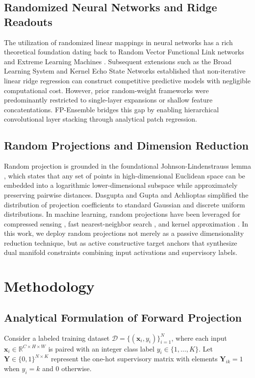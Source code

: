 \documentclass[journal]{IEEEtran}
\begin{document}
\subsection{Randomized Neural Networks and Ridge Readouts}
The utilization of randomized linear mappings in neural networks has a rich theoretical foundation dating back to Random Vector Functional Link networks \cite{pao1994functional, igelnik1995stochastic} and Extreme Learning Machines \cite{huang2006extreme, huang2011extreme}. Subsequent extensions such as the Broad Learning System \cite{chen2017broad, liu2021broad} and Kernel Echo State Networks \cite{jaeger2001echo, lukovsevivcius2012reservoir} established that non-iterative linear ridge regression can construct competitive predictive models with negligible computational cost. However, prior random-weight frameworks were predominantly restricted to single-layer expansions or shallow feature concatentations. FP-Ensemble bridges this gap by enabling hierarchical convolutional layer stacking through analytical patch regression.

\subsection{Random Projections and Dimension Reduction}
Random projection is grounded in the foundational Johnson-Lindenstrauss lemma \cite{johnson1984extensions}, which states that any set of points in high-dimensional Euclidean space can be embedded into a logarithmic lower-dimensional subspace while approximately preserving pairwise distances. Dasgupta and Gupta \cite{dasgupta2003elementary} and Achlioptas \cite{achlioptas2003database} simplified the distribution of projection coefficients to standard Gaussian and discrete uniform distributions. In machine learning, random projections have been leveraged for compressed sensing \cite{donoho2006compressed, candes2006robust}, fast nearest-neighbor search \cite{indyk1998approximate}, and kernel approximation \cite{rahimi2007random}. In this work, we deploy random projections not merely as a passive dimensionality reduction technique, but as active constructive target anchors that synthesize dual manifold constraints combining input activations and supervisory labels.

\section{Methodology}

\subsection{Analytical Formulation of Forward Projection}
Consider a labeled training dataset $\mathcal{D} = \{(\mathbf{x}_i, y_i)\}_{i=1}^N$, where each input $\mathbf{x}_i \in \mathbb{R}^{C \times H \times W}$ is paired with an integer class label $y_i \in \{1, \dots, K\}$. Let $\mathbf{Y} \in \{0, 1\}^{N \times K}$ represent the one-hot supervisory matrix with elements $\mathbf{Y}_{ik} = 1$ when $y_i = k$ and $0$ otherwise.
\end{document}
